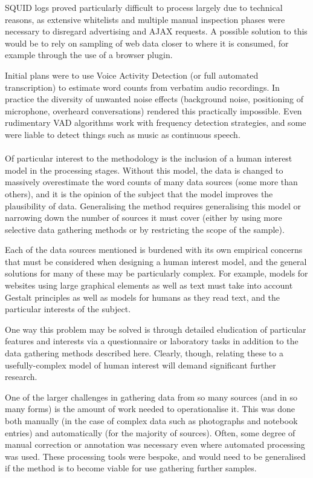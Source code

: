 SQUID logs proved particularly difficult to process largely due to technical reasons, as extensive whitelists and multiple manual inspection phases were necessary to disregard advertising and AJAX requests.  A possible solution to this would be to rely on sampling of web data closer to where it is consumed, for example through the use of a browser plugin.

Initial plans were to use Voice Activity Detection (or full automated transcription) to estimate word counts from verbatim audio recordings.  In practice the diversity of unwanted noise effects (background noise, positioning of microphone, overheard conversations) rendered this practically impossible.  Even rudimentary VAD algorithms work with frequency detection strategies, and some were liable to detect things such as music as continuous speech.  



\paragraph{}
Of particular interest to the methodology is the inclusion of a human interest model in the processing stages.  Without this model, the data is changed to massively overestimate the word counts of many data sources (some more than others), and it is the opinion of the subject that the model improves the plausibility of data.  Generalising the method requires generalising this model or narrowing down the number of sources it must cover (either by using more selective data gathering methods or by restricting the scope of the sample).  

Each of the data sources mentioned is burdened with its own empirical concerns that must be considered when designing a human interest model, and the general solutions for many of these may be particularly complex.  For example, models for websites using large graphical elements as well as text must take into account Gestalt principles as well as models for humans as they read text, and the particular interests of the subject.

One way this problem may be solved is through detailed eludication of particular features and interests via a questionnaire or laboratory tasks in addition to the data gathering methods described here.  Clearly, though, relating these to a usefully-complex model of human interest will demand significant further research.




One of the larger challenges in gathering data from so many sources (and in so many forms) is the amount of work needed to operationalise it.  This was done both manually (in the case of complex data such as photographs and notebook entries) and automatically (for the majority of sources).  Often, some degree of manual correction or annotation was necessary even where automated processing was used.  These processing tools were bespoke, and would need to be generalised if the method is to become viable for use gathering further samples.




